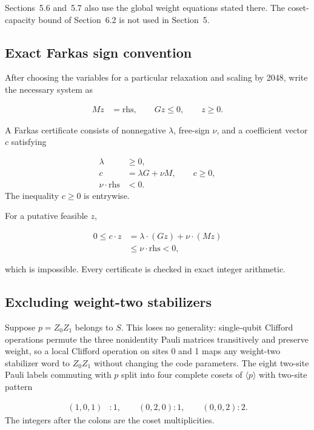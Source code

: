 \documentclass[11pt]{article}
\newcommand{\rhs}{\mathrm{rhs}}
\begin{document}
Sections~5.6 and~5.7 also use the global weight equations stated there. The coset-capacity bound of Section~6.2 is not used in Section~5.

\subsection{Exact Farkas sign convention}\label{exact-farkas-sign-convention}

After choosing the variables for a particular relaxation and scaling by 2048, write the necessary system as

\[
\begin{aligned}
M z &=\rhs,\qquad G z \leq 0,\qquad z \geq 0.
\end{aligned}
\]

A Farkas certificate consists of nonnegative \(\lambda\), free-sign \(\nu\), and a coefficient vector \(c\) satisfying

\[
\begin{aligned}
\lambda &\geq 0, \\
c &=\lambda G + \nu M, \qquad c\geq 0, \\
\nu \cdot \rhs &< 0.
\end{aligned}
\]
The inequality \(c\geq0\) is entrywise.

For a putative feasible \(z\),

\[
\begin{aligned}
0 \leq c \cdot z &=\lambda \cdot (G z) + \nu \cdot (M z) \\
 &\leq \nu \cdot \rhs < 0,
\end{aligned}
\]

which is impossible. Every certificate is checked in exact integer arithmetic.

\subsection{Excluding weight-two stabilizers}\label{excluding-weight-two-stabilizers}

Suppose \(p=Z_{0} Z_{1}\) belongs to \(S\). This loses no generality: single-qubit Clifford operations permute the three nonidentity Pauli matrices transitively and preserve weight, so a local Clifford operation on sites 0 and 1 maps any weight-two stabilizer word to \(Z_0Z_1\) without changing the code parameters. The eight two-site Pauli labels commuting with \(p\) split into four complete cosets of \(\langle p \rangle\) with two-site pattern

\[
\begin{aligned}
(1,0,1)&:1, \qquad (0,2,0):1, \qquad (0,0,2):2.
\end{aligned}
\]
The integers after the colons are the coset multiplicities.
\end{document}
